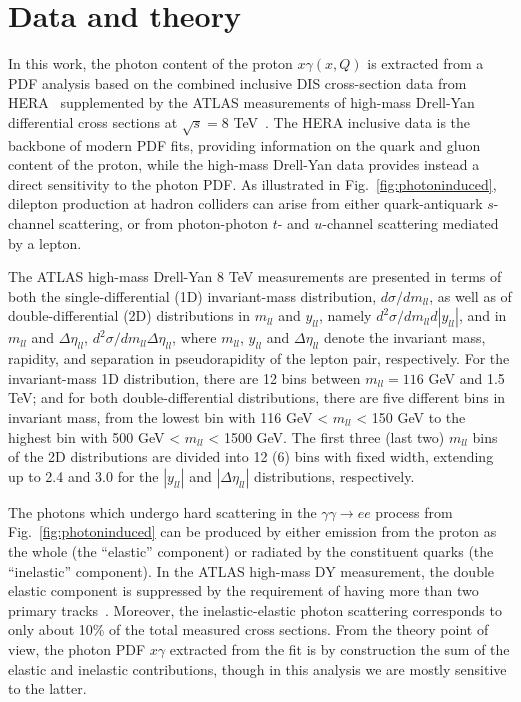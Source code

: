 \section{Data and theory}
\label{sec:theory}

In this work, the photon content of the proton $x\gamma(x,Q)$ is
extracted from a PDF analysis based on the combined inclusive DIS
cross-section data from HERA~\cite{Abramowicz:2015mha}
supplemented by the ATLAS measurements of high-mass Drell-Yan
differential cross sections at $\sqrt{s}=8$ TeV~\cite{Aad:2016zzw}.
%
The HERA inclusive data is the backbone of modern PDF fits, providing
information on the quark and gluon content of the proton, while
the high-mass Drell-Yan data provides instead a direct sensitivity to the
photon PDF.
%
As illustrated in Fig.~\ref{fig:photoninduced}, 
 dilepton production at hadron colliders can arise
from either quark-antiquark $s$-channel scattering, or from
photon-photon $t$- and $u$-channel scattering mediated by a lepton.

The ATLAS high-mass Drell-Yan 8 TeV measurements are presented in terms
of both the
single-differential (1D) invariant-mass distribution,
$d\sigma/dm_{ll}$, as well as of double-differential (2D)
distributions in $m_{ll}$ and $y_{ll}$, namely
$d^{2}\sigma/dm_{ll}d|y_{ll}|$, and in $m_{ll}$ and $\Delta\eta_{ll}$,
$d^{2}\sigma/dm_{ll}\Delta\eta_{ll}$, where $m_{ll}$, $y_{ll}$ and $\Delta\eta_{ll}$
denote the invariant mass, rapidity, and separation in pseudorapidity
of the lepton pair, respectively.
%
For the invariant-mass 1D distribution, there are 12 bins between $m_{ll}=116$ GeV
and 1.5 TeV; and for both double-differential distributions,
there are five different bins in invariant mass,
from the lowest bin with 116 GeV < $m_{ll}$ <
150 GeV to the highest bin with 500 GeV < $m_{ll}$ < 1500 GeV.
The first three (last two) $m_{ll}$ bins of the 2D distributions are divided into 12 (6) bins
with fixed width, extending up to 2.4 and 3.0 for the $|y_{ll}|$
and $|\Delta\eta_{ll}|$ distributions, respectively.
%

The photons which undergo hard scattering in the
$\gamma\gamma \to ee$  process from Fig.~\ref{fig:photoninduced}
can be produced by either  emission from the
proton as the whole (the ``elastic'' component) or radiated by the constituent quarks
(the ``inelastic'' component).
%
In the ATLAS high-mass DY measurement, the double elastic component is suppressed
 by the
 requirement of having more than two primary tracks~\cite{Aad:2016zzw}.
 Moreover, the inelastic-elastic photon scattering corresponds to only about
 10\% of the total measured cross sections.
 From the theory point of view, the photon PDF $x\gamma$ extracted from the
 fit is by construction the sum of the elastic and inelastic contributions,
 though in this analysis we are mostly sensitive to the latter.

